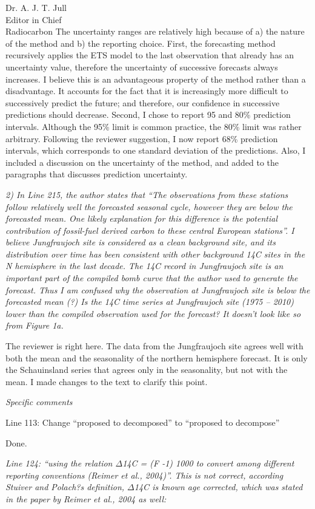 \documentclass[11pt]{bgcletter}
\begin{document}
\begin{letter}{Dr. A. J. T. Jull \\
 Editor in Chief \\ Radiocarbon}
{\color{blue} The uncertainty ranges are relatively high because of a) the nature of the method and b) the reporting choice. First, the forecasting method recursively applies the ETS model to the last observation that already has an uncertainty value, therefore the uncertainty of successive forecasts always increases. I believe this is an advantageous property of the method rather than a disadvantage. It accounts for the fact that it is increasingly more difficult to successively predict the future; and therefore, our confidence in successive predictions should decrease. Second, I chose to report 95 and 80\% prediction intervals. Although the 95\% limit is common practice, the 80\% limit was rather arbitrary. Following the reviewer suggestion, I now report 68\% prediction intervals, which corresponds to one standard deviation of the predictions. Also, I included a discussion on the uncertainty of the method, and added to the paragraphs that discusses prediction uncertainty.}

{\it 2) In Line 215, the author states that ``The observations from these stations follow relatively well the forecasted seasonal cycle, however they are below the forecasted mean. One likely explanation for this difference is the potential contribution of fossil-fuel derived carbon to these central European stations''.  I believe Jungfraujoch site is considered as a clean background site, and its distribution over time has been consistent with other background 14C sites in the N hemisphere in the last decade.  The 14C record in Jungfraujoch site is an important part of the compiled bomb curve that the author used to generate the forecast.  Thus I am confused why the observation at Jungfraujoch site is below the forecasted mean (?) Is the 14C time series at Jungfraujoch site (1975 -- 2010) lower than the compiled observation used for the forecast? It doesn't look like so from Figure 1a.}

{\color{blue} The reviewer is right here. The data from the Jungfraujoch site agrees well with both the mean and the seasonality of the northern hemisphere forecast. It is only the Schauinsland series that agrees only in the seasonality, but not with the mean. I made changes to the text to clarify this point. }

{\it Specific comments

Line 113: Change ``proposed to decomposed'' to ``proposed to decompose''}

{\color{blue} Done.}

{\it Line 124: ``using the relation $\Delta$14C = (F -1)  1000 to convert among different reporting conventions (Reimer et al., 2004)''. This is not correct, according Stuiver and Polach?s definition, $\Delta$14C is known age corrected, which was stated in the paper by Reimer et al., 2004 as well:

}
\end{letter}
\end{document}
